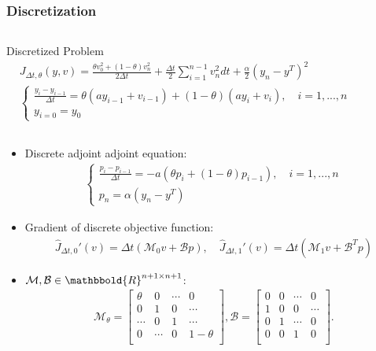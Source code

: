 \documentclass[9pt]{beamer}
\begin{document}
\begin{frame}
\frametitle{Discretization}
\begin{columns}
\begin{block}{Discretized Problem}
\begin{align*}
&J_{\Delta t,\theta}(y,v) = \frac{\theta v_0^2 +(1-\theta)v_n^2}{2\Delta t}+\frac{\Delta t}{2}\sum_{i=1}^{n-1}v_n^2dt + \frac{\alpha}{2}(y_n-y^T)^2 \\
&\left\{
     \begin{array}{lr}
	\frac{y_i-y_{i-1}}{\Delta t} = \theta(ay_{i-1} +v_{i-1})+(1-\theta)(ay_i +v_i),\quad i=1,...,n\\
	y_{i=0}=y_0
	\end{array}
   \right. 
\end{align*}
\end{block}
\end{columns}
\begin{itemize}

\item{Discrete adjoint adjoint equation:{\small\begin{align*}
\left\{
     \begin{array}{lr}
	\frac{p_i-p_{i-1}}{\Delta t} = -a(\theta p_i+(1-\theta)p_{i-1}),\quad i=1,...,n\\
	p_{n}=\alpha(y_n-y^T)
	\end{array}
   \right.
\end{align*}}}
\item{Gradient of discrete objective function:
{\small\begin{align*}
\hat J_{\Delta t,0}'(v) = \Delta t(\mathcal{M}_{0}v+\mathcal{B} p),\quad \hat J_{\Delta t,1}'(v) = \Delta t(\mathcal{M}_{1}v+\mathcal{B}^T p)
\end{align*}}}
\item<2->{$\mathcal{M},\mathcal{B}\in\mathbbold{R}^{n+1\times n+1}$:{\small
\begin{align*}
\mathcal{M}_{\theta}=\left[ \begin{array}{cccc}
   \theta &0&  \cdots & 0 \\  
   0 & 1  & 0&\cdots \\ 
   \cdots &0 & 1 &\cdots  \\
   0 &\cdots & 0 &1-\theta \\
   \end{array}  \right],
\mathcal{B} = \left[ \begin{array}{cccc}
   0 & 0& \cdots & 0 \\  
   1 & 0 &0 & \cdots \\ 
   0 &1   & \cdots& 0 \\
   0 & 0 & 1 & 0 \\
   \end{array}  \right].
\end{align*}}
}

\end{itemize}

\end{frame}
\end{document}
